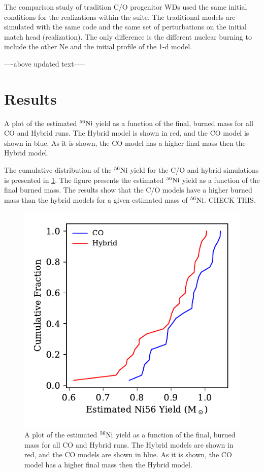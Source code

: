 \documentclass[iop,apj]{emulateapj}
\newcommand{\Ni}[1]{\ensuremath{{}^{#1}{\rm Ni}}}
\begin{document}
The comparison study of tradition C/O progenitor WDs used the same initial
conditions for the realizations within the suite. The traditional models
are simulated with the same code and the same set of perturbations on the
initial match head (realization). The only difference is the different
nuclear burning to include the other Ne and the initial profile of the
1-d model.

----above updated text-----



\section{Results}

A plot of the estimated \Ni{56} yield as a function of the final, burned mass
for all CO and Hybrid runs. The Hybrid model is shown in red, and the CO
model is shown in blue. As it is shown, the CO model has a higher final mass
then the Hybrid model. 

The cumulative distribution of the \Ni{56} yield for the C/O and hybrid
simulations is presented in \ref{fig:cumdist}. 
The figure presents the estimated \Ni{56} yield as a function of the final burned 
mass. The results show that the C/O models have a higher burned mass than the
hybrid models for a given estimated mass of \Ni{56}. CHECK THIS.  


\begin{figure}
\includegraphics[width=\columnwidth]{figures/ni56_yield_cum_dist.pdf}
\caption{\label{fig:cumdist}
A plot of the estimated \Ni{56} yield as a function of the final, burned mass
for all CO and Hybrid runs. The Hybrid models are shown in red, and the CO
models are shown in blue. As it is shown, the CO model has a higher final mass
then the Hybrid model. 
}
\end{figure}
\end{document}
